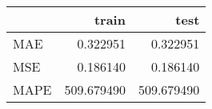 \begin{tabular}{lrr}
\toprule
{} &       train &        test \\
\midrule
MAE  &    0.322951 &    0.322951 \\
MSE  &    0.186140 &    0.186140 \\
MAPE &  509.679490 &  509.679490 \\
\bottomrule
\end{tabular}
